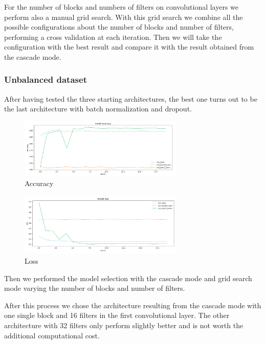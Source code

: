 \documentclass{article}
\begin{document}
For the number of blocks and numbers of filters on convolutional layers we perform also a manual grid search. With this grid search we combine all the possible configurations about the number of blocks and number of filters, performing a cross validation at each iteration. Then we will take the configuration with the best result and compare it with the result obtained from the cascade mode.

\subsubsection{Unbalanced dataset}
After having tested the three starting architectures, the best one turns out to be the last architecture with batch normalization and dropout.

\begin{figure}[h]
    \centering
    \includegraphics[width=0.7\textwidth]{images/accuracy_unbalance.png}
    \caption{Accuracy}
    \label{fig:acc_unbalance}
\end{figure}

\begin{figure}[h]
    \centering
    \includegraphics[width=0.7\textwidth]{images/loss_unbalance.png}
    \caption{Loss}
    \label{fig:loss_unbalance}
\end{figure}

Then we performed the model selection with the cascade mode and grid search mode varying the number of blocks and number of filters. 

After this process we chose the architecture resulting from the cascade mode with one single block and 16 filters in the first convolutional layer. The other architecture with 32 filters only perform slightly better and is not worth the additional computational cost.
\end{document}
